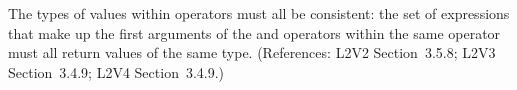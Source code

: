 The types of values within  operators must all
be consistent: the set of expressions that make up the first
arguments of the  and  operators
within the same  operator must all return
values of the same type.  (References: L2V2 Section~3.5.8; L2V3 
Section~3.4.9; L2V4 Section~3.4.9.)
